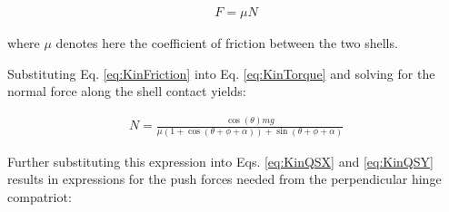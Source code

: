 \documentclass[letterpaper]{report}
\begin{document}
\begin{align}
  F = \mu N
  \label{eq:KinFriction}
\end{align}

where $\mu$ denotes here the coefficient of friction between the two shells.

Substituting Eq. \ref{eq:KinFriction} into Eq. \ref{eq:KinTorque} and solving for the normal force along the shell contact yields:

\begin{align}
N = \frac{\cos(\theta) m g}{\mu (1+\cos(\theta + \phi + \alpha)) + \sin(\theta + \phi + \alpha)}
\end{align}

Further substituting this expression into Eqs. \ref{eq:KinQSX} and \ref{eq:KinQSY} results in expressions for the push forces needed from the perpendicular hinge compatriot:
\end{document}
